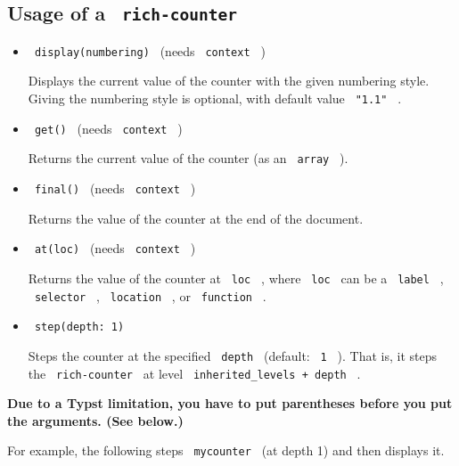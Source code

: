 \subsection{\texorpdfstring{Usage of a
\texttt{\ rich-counter\ }}{Usage of a  rich-counter }}\label{usage-of-a-rich-counter}

\begin{itemize}
\item
  \texttt{\ display(numbering)\ } (needs \texttt{\ context\ } )

  Displays the current value of the counter with the given numbering
  style. Giving the numbering style is optional, with default value
  \texttt{\ "1.1"\ } .
\item
  \texttt{\ get()\ } (needs \texttt{\ context\ } )

  Returns the current value of the counter (as an \texttt{\ array\ } ).
\item
  \texttt{\ final()\ } (needs \texttt{\ context\ } )

  Returns the value of the counter at the end of the document.
\item
  \texttt{\ at(loc)\ } (needs \texttt{\ context\ } )

  Returns the value of the counter at \texttt{\ loc\ } , where
  \texttt{\ loc\ } can be a \texttt{\ label\ } , \texttt{\ selector\ } ,
  \texttt{\ location\ } , or \texttt{\ function\ } .
\item
  \texttt{\ step(depth:\ 1)\ }

  Steps the counter at the specified \texttt{\ depth\ } (default:
  \texttt{\ 1\ } ). That is, it steps the \texttt{\ rich-counter\ } at
  level \texttt{\ inherited\_levels\ +\ depth\ } .
\end{itemize}

\textbf{Due to a Typst limitation, you have to put parentheses before
you put the arguments. (See below.)}

For example, the following steps \texttt{\ mycounter\ } (at depth 1) and
then displays it.

\begin{Shaded}
\begin{Highlighting}[]

\end{Highlighting}
\end{Shaded}

